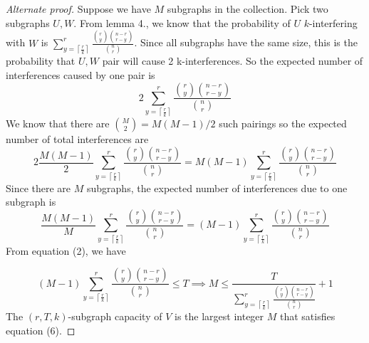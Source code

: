 \documentclass[10pt]{extarticle}
\theoremstyle{definition}
\begin{document}
\begin{proof}[Alternate proof]
    Suppose we have $M$ subgraphs in the collection. Pick two subgraphs $U,W$. From lemma 4., we know that the probability of $U$ $k$-interfering with $W$ is $\sum_{y = \left\lceil \frac{r}{k} \right\rceil}^{r}  \frac{\binom{r}{y} \binom{n-r}{r-y}}{\binom{n}{r}}$. Since all subgraphs have the same size, this is the probability that $U,W$ pair will cause 2 k-interferences. So the expected number of interferences caused by one pair is
    $$
    2\sum_{y = \left\lceil \frac{r}{k} \right\rceil}^{r}  \frac{\binom{r}{y} \binom{n-r}{r-y}}{\binom{n}{r}} 
    $$
    We know that there are $\binom{M}{2} = M(M-1)/2$ such pairings so the expected number of total interferences are 
    $$
    2 \frac{M(M-1)}{2} \sum_{y = \left\lceil \frac{r}{k} \right\rceil}^{r}  \frac{\binom{r}{y} \binom{n-r}{r-y}}{\binom{n}{r}}  =  M(M-1) \sum_{y = \left\lceil \frac{r}{k} \right\rceil}^{r}  \frac{\binom{r}{y} \binom{n-r}{r-y}}{\binom{n}{r}} 
    $$
    Since there are $M$ subgraphs, the expected number of interferences due to one subgraph is
    $$
    \frac{M(M-1)}{M} \sum_{y = \left\lceil \frac{r}{k} \right\rceil}^{r}  \frac{\binom{r}{y} \binom{n-r}{r-y}}{\binom{n}{r}}  = (M-1) \sum_{y = \left\lceil \frac{r}{k} \right\rceil}^{r}  \frac{\binom{r}{y} \binom{n-r}{r-y}}{\binom{n}{r}} 
    $$
    From equation (2), we have 

    \begin{equation}
        (M-1) \sum_{y = \left\lceil \frac{r}{k} \right\rceil}^{r}  \frac{\binom{r}{y} \binom{n-r}{r-y}}{\binom{n}{r}}  \le T \implies M \le \frac{T}{\sum_{y = \left\lceil \frac{r}{k} \right\rceil}^{r}  \frac{\binom{r}{y} \binom{n-r}{r-y}}{\binom{n}{r}}} + 1
    \end{equation}
    The $(r,T,k)$-subgraph capacity of $V$ is the largest integer $M$ that satisfies equation (6).
    
\end{proof}
\end{document}
